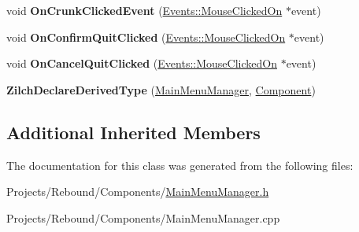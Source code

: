 \begin{DoxyCompactItemize}
\item 
\hypertarget{classDCEngine_1_1Components_1_1MainMenuManager_a21556893802a0a8b9c10db3780d0b255}{void {\bfseries On\-Crunk\-Clicked\-Event} (\hyperlink{classDCEngine_1_1Events_1_1MouseClickedOn}{Events\-::\-Mouse\-Clicked\-On} $\ast$event)}\label{classDCEngine_1_1Components_1_1MainMenuManager_a21556893802a0a8b9c10db3780d0b255}

\item 
\hypertarget{classDCEngine_1_1Components_1_1MainMenuManager_a90a22003efbe6e3fe70f23157aeb68ca}{void {\bfseries On\-Confirm\-Quit\-Clicked} (\hyperlink{classDCEngine_1_1Events_1_1MouseClickedOn}{Events\-::\-Mouse\-Clicked\-On} $\ast$event)}\label{classDCEngine_1_1Components_1_1MainMenuManager_a90a22003efbe6e3fe70f23157aeb68ca}

\item 
\hypertarget{classDCEngine_1_1Components_1_1MainMenuManager_aac0c1c33ca46a5af461abc0bb117c623}{void {\bfseries On\-Cancel\-Quit\-Clicked} (\hyperlink{classDCEngine_1_1Events_1_1MouseClickedOn}{Events\-::\-Mouse\-Clicked\-On} $\ast$event)}\label{classDCEngine_1_1Components_1_1MainMenuManager_aac0c1c33ca46a5af461abc0bb117c623}

\item 
\hypertarget{classDCEngine_1_1Components_1_1MainMenuManager_a5f35647561e885b4b475f5cca1e5340d}{{\bfseries Zilch\-Declare\-Derived\-Type} (\hyperlink{classDCEngine_1_1Components_1_1MainMenuManager}{Main\-Menu\-Manager}, \hyperlink{classDCEngine_1_1Component}{Component})}\label{classDCEngine_1_1Components_1_1MainMenuManager_a5f35647561e885b4b475f5cca1e5340d}

\end{DoxyCompactItemize}
\subsection*{Additional Inherited Members}


The documentation for this class was generated from the following files\-:\begin{DoxyCompactItemize}
\item 
Projects/\-Rebound/\-Components/\hyperlink{MainMenuManager_8h}{Main\-Menu\-Manager.\-h}\item 
Projects/\-Rebound/\-Components/Main\-Menu\-Manager.\-cpp\end{DoxyCompactItemize}
